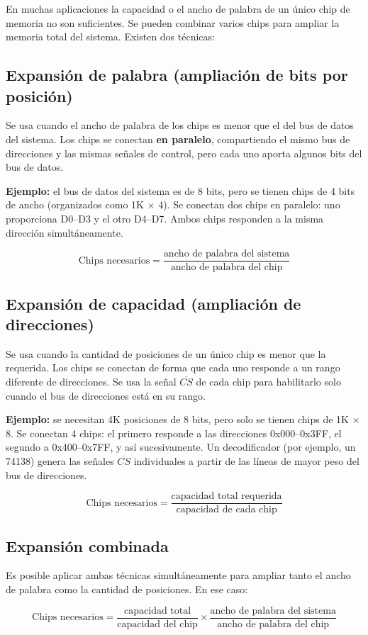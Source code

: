 En muchas aplicaciones la capacidad o el ancho de palabra de un único chip de memoria no son suficientes. Se pueden combinar varios chips para ampliar la memoria total del sistema. Existen dos técnicas:

\subsection{Expansión de palabra (ampliación de bits por posición)}

Se usa cuando el ancho de palabra de los chips es menor que el del bus de datos del sistema. Los chips se conectan \textbf{en paralelo}, compartiendo el mismo bus de direcciones y las mismas señales de control, pero cada uno aporta algunos bits del bus de datos.

\textbf{Ejemplo:} el bus de datos del sistema es de 8 bits, pero se tienen chips de 4 bits de ancho (organizados como 1K $\times$ 4). Se conectan dos chips en paralelo: uno proporciona D0--D3 y el otro D4--D7. Ambos chips responden a la misma dirección simultáneamente.


$$\text{Chips necesarios} = \frac{\text{ancho de palabra del sistema}}{\text{ancho de palabra del chip}}$$

\subsection{Expansión de capacidad (ampliación de direcciones)}

Se usa cuando la cantidad de posiciones de un único chip es menor que la requerida. Los chips se conectan de forma que cada uno responde a un rango diferente de direcciones. Se usa la señal $\overline{CS}$ de cada chip para habilitarlo solo cuando el bus de direcciones está en su rango.

\textbf{Ejemplo:} se necesitan 4K posiciones de 8 bits, pero solo se tienen chips de 1K $\times$ 8. Se conectan 4 chips: el primero responde a las direcciones 0x000--0x3FF, el segundo a 0x400--0x7FF, y así sucesivamente. Un decodificador (por ejemplo, un 74138) genera las señales $\overline{CS}$ individuales a partir de las líneas de mayor peso del bus de direcciones.


$$\text{Chips necesarios} = \frac{\text{capacidad total requerida}}{\text{capacidad de cada chip}}$$

\subsection{Expansión combinada}

Es posible aplicar ambas técnicas simultáneamente para ampliar tanto el ancho de palabra como la cantidad de posiciones. En ese caso:

$$\text{Chips necesarios} = \frac{\text{capacidad total}}{\text{capacidad del chip}} \times \frac{\text{ancho de palabra del sistema}}{\text{ancho de palabra del chip}}$$
